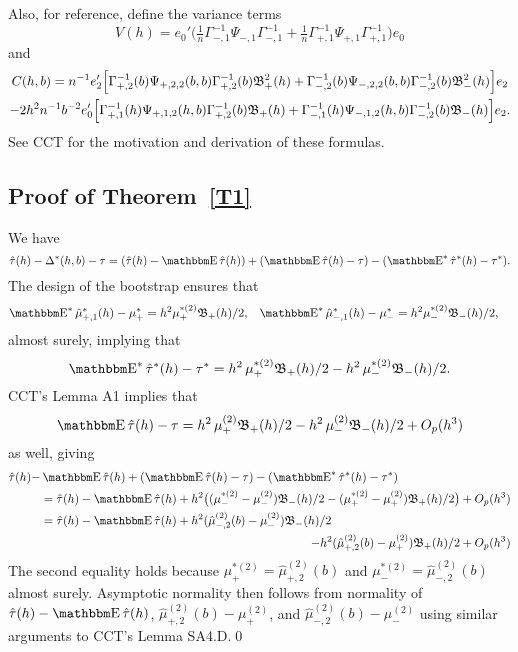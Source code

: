 \documentclass[12pt,fleqn]{article}
\begin{document}
Also, for reference, define the variance terms
\begin{equation*}
  V(h)
  = e_0' \Big(\tfrac{1}{n} \Gamma_{-,1}^{-1} \Psi_{-,1} \Gamma_{-,1}^{-1}
  + \tfrac{1}{n} \Gamma_{+,1}^{-1} \Psi_{+,1} \Gamma_{+,1}^{-1}\Big) e_0
\end{equation*}
and
\begin{multline*}
  C(h,b) =
  n^{-1} e_2' \Big[
    \Gamma_{+,2}^{-1}(b) \Psi_{+,2,2}(b,b) \Gamma_{+,2}^{-1}(b) \mathfrak{B}^2_+(h) +
    \Gamma_{-,2}^{-1}(b) \Psi_{-,2,2}(b,b) \Gamma_{-,2}^{-1}(b) \mathfrak{B}^2_-(h)
    \Big] e_2 \\
  - 2 h^2 n^{-1} b^{-2}
    e_0' \Big[
    \Gamma^{-1}_{+,1}(h) \Psi_{+,1,2}(h,b) \Gamma_{+,2}^{-1}(b) \mathfrak{B}_+(h) +
    \Gamma^{-1}_{-,1}(h) \Psi_{-,1,2}(h,b) \Gamma_{-,2}^{-1}(b) \mathfrak{B}_-(h)
    \Big] e_2.
\end{multline*}
See CCT for the motivation and derivation of these formulas.

\subsection{Proof of Theorem~\ref{T1}}
We have
\begin{equation*}
  \hat\tau(h) - \Delta^*(h,b) - \tau = (\hat\tau(h) - \E \hat \tau(h)) +
  (\E \hat \tau(h) - \tau) - (\E^* \hat \tau^*(h) - \tau^*).
\end{equation*}
The design of the bootstrap ensures that
\begin{align*}
  \E^* \hat\mu_{+,1}^*(h) - \mu_{+}^{*}
  &= h^{2} \mu_{+}^{*(2)} \Bf_{+}(h)/2,
  &\E^* \hat\mu_{-,1}^*(h) - \mu_{-}^{*}
  &= h^{2} \mu_{-}^{*(2)} \Bf_{-}(h)/2,
\end{align*}
almost surely, implying that
\begin{equation*}
  \E^* \hat\tau^*(h) - \tau^{*} = h^2\, \mu_+^{*(2)} \Bf_+(h)/2
  - h^2\, \mu_{-}^{*(2)} \Bf_{-}(h)/2.
\end{equation*}
CCT's Lemma A1 implies that
\begin{equation*}
  \E \hat\tau(h) - \tau = h^2\, \mu_+^{(2)} \Bf_+(h)/2
  - h^2\, \mu_{-}^{(2)} \Bf_{-}(h)/2 + O_p(h^3)
\end{equation*}
as well, giving
\begin{align}
  \hat\tau(h) - & \E \hat\tau(h) + (\E \hat\tau(h) - \tau) - (\E^* \hat\tau^*(h) - \tau^*)\notag \\
  &= \hat\tau(h) - \E\hat\tau(h)
   + h^2 \big((\mu_{-}^{*(2)} - \mu_{-}^{(2)}) \Bf_{-}(h) /2
   - (\mu_+^{*(2)}-\mu_+^{(2)}) \Bf_{+}(h) / 2 \big) + O_p(h^{3}) \notag \\
  \label{eq:6}
  &= \hat\tau(h) - \E\hat\tau(h)
   + h^2 (\hat\mu_{-,2}^{(2)}(b) - \mu_-^{(2)}) \Bf_{-}(h) /2 \\
  \notag
  &\pushright{- h^2 (\hat\mu_{+,2}^{(2)}(b) - \mu_+^{(2)}) \Bf_{+}(h) / 2
   + O_p(h^{3})}
\end{align}
The second equality holds because
$\mu_+^{*(2)} = \hat\mu_{+,2}^{(2)}(b)$ and
$\mu_-^{*(2)} = \hat\mu_{-,2}^{(2)}(b)$ almost surely. Asymptotic
normality then follows from normality of $\hat\tau(h) - \E\hat\tau(h)$,
$\hat\mu_{+,2}^{(2)}(b) - \mu_+^{(2)}$, and
$\hat\mu_{-,2}^{(2)}(b) - \mu_-^{(2)}$ using similar arguments to
CCT's Lemma SA4.D.\qed
\end{document}
